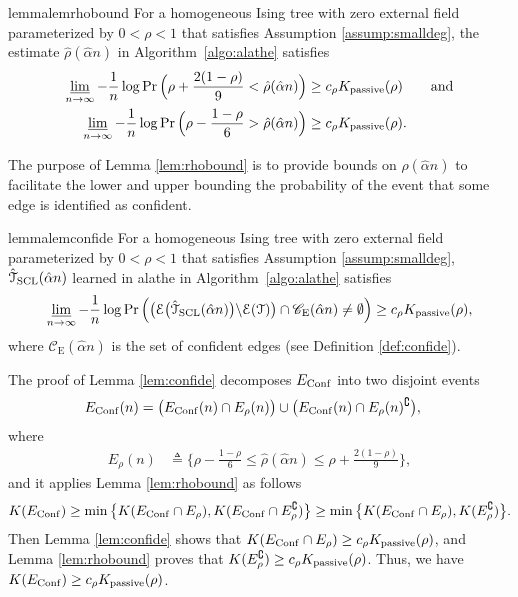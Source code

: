 \documentclass[11pt,onecolumn]{article}
\newcommand{\calE}{\mathcal{E}}
\newcommand{\calT}{\mathcal{T}}
\newcommand{\hatcalT}{\hat{\calT}}
\newcommand{\scC}{\mathscr{C}}
\newcommand{\halpha}{\hat{\alpha}}
\newcommand{\hrho}{\hat{\rho}}
\newcommand{\Passive}{{\rm passive}}
\begin{document}
\begin{restatable}{lemma}{lemrhobound}
\label{lem:rhobound}
For a homogeneous Ising tree with zero external field parameterized by $0<\rho<1$ that satisfies Assumption \ref{assump:smalldeg}, the estimate $\hrho(\halpha n)$ in Algorithm~\ref{algo:alathe} satisfies 
\begin{align}
	\varliminf_{n\rightarrow\infty}-\frac{1}{n}\log\Pr\Big(\rho+\frac{2(1-\rho)}{9}<\hrho(\halpha n)\Big)&\geq c_{\rho}K _{\Passive}(\rho)\qquad\mbox{and}\\ \varliminf_{n\rightarrow\infty}-\frac{1}{n}\log\Pr\Big(\rho-\frac{1-\rho}{6}>\hrho(\halpha n)\Big)&\geq c_{\rho}K _{\Passive}(\rho).
\end{align}
\end{restatable}
The purpose of Lemma \ref{lem:rhobound} is to provide   bounds on $\hrho(\halpha n)$ to facilitate the  lower  and upper bounding the probability of the event that some edge is identified as confident.
\begin{restatable}{lemma}{lemconfide}
\label{lem:confide}
For a homogeneous Ising tree with zero external field parameterized by $0<\rho<1$ that satisfies Assumption \ref{assump:smalldeg}, $\hatcalT_{\rm{SCL}}(\halpha n)$ learned in  \ac{alathe} in Algorithm~\ref{algo:alathe} satisfies
\begin{align} 
	\varliminf_{n\rightarrow\infty}-\frac{1}{n}\log\Pr\Big(\big(\calE\big(\hatcalT_{\rm{SCL}}(\halpha n)\big)\backslash \calE(\calT)\big)\cap \scC_{\mathrm{E}}(\halpha n)\neq \emptyset\Big)\geq c_{\rho}K _{\Passive}(\rho),\label{ieq:confide}
\end{align}
where $\scC_{\mathrm{E}}(\halpha n)$ is the set of confident edges (see Definition \ref{def:confide}). 
\end{restatable}
The proof of Lemma \ref{lem:confide} decomposes $E_{{\rm Conf}}$ into two disjoint events
\begin{align}
	E_{{\rm Conf}}(n)&=\big(E_{{\rm Conf}}(n)\cap E_{\rho}(n)\big)\cup\big(E_{{\rm Conf}}(n)\cap E_{\rho}(n)^{\complement}\big),
\end{align}
where 
\begin{align}
	E_{\rho}(n)&\triangleq\Big\{\rho-\frac{1-\rho}{6}\leq\hrho(\halpha n)\leq\rho+\frac{2(1-\rho)}{9}\Big\},
\end{align}
and it applies  Lemma \ref{lem:rhobound} as follows
\begin{align}
    K (E_{{\rm Conf}})\geq\min \big\{K (E_{{\rm Conf}}\cap E_{\rho}),K (E_{{\rm Conf}}\cap E_{\rho}^{\complement})\big\}\geq \min \big\{K (E_{{\rm Conf}}\cap E_{\rho}),K (E_{\rho}^{\complement})\big\}.
\end{align}
Then Lemma \ref{lem:confide} shows that $K (E_{{\rm Conf}}\cap E_{\rho})\geq c_{\rho}K _{\Passive}(\rho)$, and Lemma \ref{lem:rhobound} proves that $K (E_{\rho}^{\complement})\geq c_{\rho}K _{\Passive}(\rho)$. Thus, we have $K (E_{{\rm Conf}})\geq c_{\rho}K _{\Passive}(\rho)$.
\end{document}
